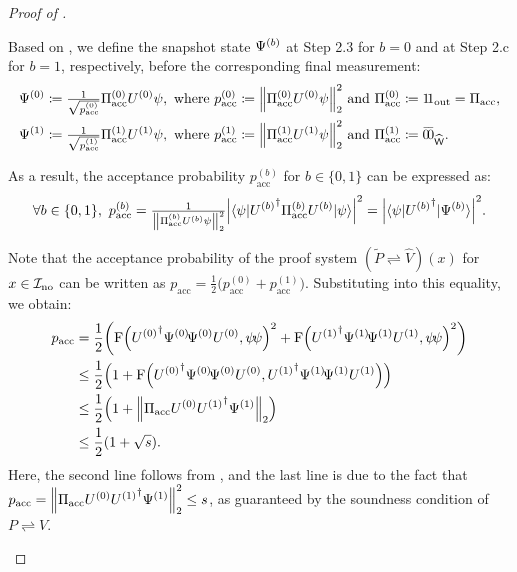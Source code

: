 \documentclass[10pt,a4paper]{article}
\numberwithin{equation}{section}
\numberwithin{figure}{section}
\newcommand{\protocol}[2]{{#1}\!\rightleftharpoons\!{#2}}
\DeclarePairedDelimiter\rbra{\lparen}{\rparen}
\DeclarePairedDelimiter\abs{\lvert}{\rvert}
\DeclarePairedDelimiter\norm{\lVert}{\rVert}
\let\ket\relax\DeclarePairedDelimiter\ket{\lvert}{\rangle}
\let\bra\relax\DeclarePairedDelimiter\bra{\langle}{\rvert}
\newcommand{\ketbra}[2]{\ensuremath{\ket{#1}\!\bra{#2}}}
\newcommand{\braket}[3]{\langle #1 | #2 | #3 \rangle}
\newcommand{\F}{\mathrm{F}}
\newcommand{\no}{{\rm no}}
\newcommand{\acc}{\mathrm{acc}}
\newcommand{\pacc}{p_{\mathrm{acc}}}
\newcommand{\binset}{\{0,1\}}
\newcommand{\Out}{\mathrm{out}}
\newcommand{\calI}{\mathcal{I}}
\newcommand{\sfW}{\mathsf{W}}
\begin{document}
\begin{proof}[Proof of ]
\begin{itemize}[leftmargin=1.5em]
        Based on , we define the snapshot state $\ket{\Psi^{(b)}}$ at Step 2.3 for $b=0$ and at Step 2.c for $b=1$, respectively, before the corresponding final measurement:
        \begin{align*}
            &\ket{\Psi^{(0)}} \coloneqq \tfrac{1}{\sqrt{\pacc^{(0)}}} \Pi_\acc^{(0)} U^{(0)} \ket{\psi}, \text{ where } \pacc^{(0)} \coloneqq \norm*{\Pi_\acc^{(0)} U^{(0)} \ket{\psi}}^2_2 \text{ and } \Pi_\acc^{(0)} \coloneqq \ketbra{1}{1}_{\Out} = \Pi_\acc,\\
            &\ket{\Psi^{(1)}} \coloneqq \tfrac{1}{\sqrt{\pacc^{(1)}}} \Pi_\acc^{(1)} U^{(1)} \ket{\psi}, \text{ where } \pacc^{(1)} \coloneqq \norm*{\Pi_\acc^{(1)} U^{(1)} \ket{\psi}}^2_2 \text{ and } \Pi_\acc^{(1)} \coloneqq \ketbra{\bar{0}}{\bar{0}}_{\widehat{\sfW}}.
        \end{align*}

        As a result, the acceptance probability $\pacc^{(b)}$ for $b\in\binset$ can be expressed as: 
        \begin{equation}
            \label{eq:parallelization-pacc}
            \forall b\in\binset,~\pacc^{(b)} = \tfrac{1}{\norm*{\Pi_\acc^{(b)} U^{(b)} \ket{\psi}}^2_2} \abs*{ \braket{\psi}{{U^{(b)}}^{\dagger} \Pi_\acc^{(b)} U^{(b)}}{\psi} }^2
            = \abs*{\braket{\psi}{{U^{(b)}}^{\dagger}}{\Psi^{(b)}}}^2.
        \end{equation}

        Note that the acceptance probability of the proof system $(\protocol{\widetilde{P}}{\widehat{V}})(x)$ for $x \in \calI_{\no}$ can be written as $\pacc = \frac{1}{2} \big( \pacc^{(0)} + \pacc^{(1)} \big)$. Substituting  into this equality, we obtain:
        \begin{align*}
            \pacc &= \frac{1}{2}\rbra*{\F\rbra*{{U^{(0)}}^{\dagger} \ketbra{\Psi^{(0)}}{\Psi^{(0)}} U^{(0)}, \ketbra{\psi}{\psi}}^2 + \F\rbra*{{U^{(1)}}^{\dagger} \ketbra{\Psi^{(1)}}{\Psi^{(1)}} U^{(1)}, \ketbra{\psi}{\psi}}^2}\\
            &\leq \frac{1}{2} \rbra*{1 + \F\rbra*{{U^{(0)}}^{\dagger} \ketbra{\Psi^{(0)}}{\Psi^{(0)}} U^{(0)}, {U^{(1)}}^{\dagger} \ketbra{\Psi^{(1)}}{\Psi^{(1)}} U^{(1)}}}\\
            &\leq \frac{1}{2} \rbra*{1 + \norm*{\Pi_\acc U^{(0)}{U^{(1)}}^{\dagger}\ket{\Psi^{(1)}}}_2}\\
            &\leq \frac{1}{2} (1+\sqrt{s}).
        \end{align*}
        Here, the second line follows from , and the last line is due to the fact that $\pacc = \norm*{\Pi_\acc U^{(0)}{U^{(1)}}^{\dagger}\ket{\Psi^{(1)}}}^2_2 \leq s$, as guaranteed by the soundness condition of $\protocol{P}{V}$. \qedhere
    \end{itemize}    
\end{proof}
\end{document}
